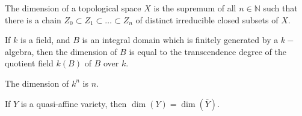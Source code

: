 \documentclass[crop=false,class=article,oneside]{standalone}
\begin{document}
    \begin{definition}
    The dimension of a topological space $X$ is the supremum of all $n\in \mathbb{N}$ such that there is a chain $Z_0\subset Z_1\subset \hdots \subset Z_n$ of distinct irreducible closed subsets of $X$.
    \end{definition}
    \begin{theorem}
    If $k$ is a field, and $B$ is an integral domain which is finitely generated by a $k-$algebra, then the dimension of $B$ is equal to the transcendence degree of the quotient field $k(B)$ of $B$ over $k$.
    \end{theorem}
    \begin{theorem}
    The dimension of $k^n$ is $n$.
    \end{theorem}
    \begin{theorem}
    If $Y$ is a quasi-affine variety, then $\dim(Y) = \dim(\overline{Y})$.
    \end{theorem}
\end{document}
